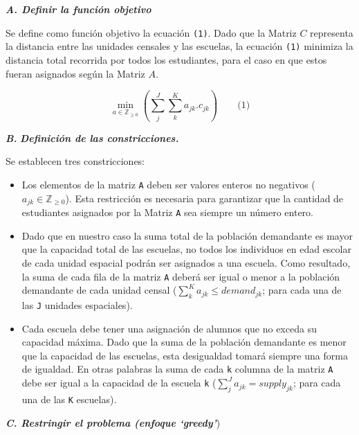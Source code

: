 \documentclass[
  spanish,
  a4paper,%
  chapterprefix=true,%
  DIV=calc,%
  twoside]{scrbook}%
\newcommand{\passthrough}[1]{#1}
\providecommand{\tightlist}{%
  \setlength{\itemsep}{0pt}\setlength{\parskip}{0pt}}
\begin{document}
\textbf{\emph{A. Definir la función objetivo}}

Se define como función objetivo la ecuación \passthrough{\lstinline!(1)!}. Dado que la Matriz \(C\) representa la distancia entre las unidades censales y las escuelas, la ecuación \passthrough{\lstinline!(1)!} minimiza la distancia total recorrida por todos los estudiantes, para el caso en que estos fueran asignados según la Matriz \(A\).

\[
\min_{a \in \mathbb Z_{\geq 0}}( \sum_j^J \sum_k^K a_{jk}.c_{jk} ) \quad \quad \textrm{(1)}
\]

\textbf{\emph{B.}} \textbf{\emph{Definición de las constricciones.}}

Se establecen tres constricciones:

\begin{itemize}
\tightlist
\item
  Los elementos de la matriz \passthrough{\lstinline!A!} deben ser valores enteros no negativos (\(a_{jk} \in \mathbb Z_{\geq 0}\)). Esta restricción es necesaria para garantizar que la cantidad de estudiantes asignados por la Matriz \passthrough{\lstinline!A!} sea siempre un número entero.
\item
  Dado que en nuestro caso la suma total de la población demandante es mayor que la capacidad total de las escuelas, no todos los individuos en edad escolar de cada unidad espacial podrán ser asignados a una escuela. Como resultado, la suma de cada fila de la matriz \passthrough{\lstinline!A!} deberá ser igual o menor a la población demandante de cada unidad censal (\(\sum_k^K a_{jk} \leq demand_{jk}\); para cada una de las \passthrough{\lstinline!J!} unidades espaciales).
\item
  Cada escuela debe tener una asignación de alumnos que no exceda su capacidad máxima. Dado que la suma de la población demandante es menor que la capacidad de las escuelas, esta desigualdad tomará siempre una forma de igualdad. En otras palabras la suma de cada \passthrough{\lstinline!k!} columna de la matriz \passthrough{\lstinline!A!} debe ser igual a la capacidad de la escuela \passthrough{\lstinline!k!} (\(\sum_j^J a_{jk} = supply_{jk}\); para cada una de las \passthrough{\lstinline!K!} escuelas).
\end{itemize}

\textbf{\emph{C. Restringir el problema (enfoque `greedy'}})
\end{document}
